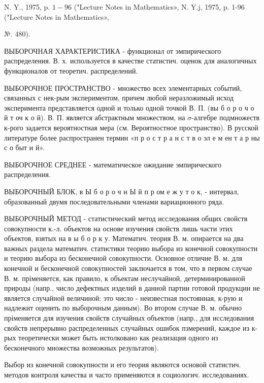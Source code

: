 \documentclass[10pt]{article}
\begin{document}
N. Y., 1975, p. $1-96$ ("Lecture Notes in Mathematics», N. Y.j, 1975, p. 1-96 ("Lecture Notes in Mathematics»,

№. 480).



ВЫБОРОЧНАЯ ХАРАКТЕРИСТИКА - функционал от эмпирического распределения. В. х. используется в качестве статистич. оценок для аналогичных функционалов от теоретич. распределений.



ВЫБОРОЧНОЕ ПРОСТРАНСТВО - множество всех элементарных событий, связанных с нек-рым экспериментом, причем любой неразложимый исход эксперимента представляется одной и только одной точкой В. П. (вы б о р о ч о й т оч к о й). В. П. является абстрактным множеством, на $\sigma$-алгебре подмножеств к-рого задается вероятностная мера (см. Вероятностное пространство). В русской литературе более распространен термин «п р о с т р а н с т в о эл е м ен т а р ны с о быт и й».



ВЫБОРОЧНОЕ СРЕДНЕЕ - математическое ожидание эмпирического распределения.



ВЫБОРОЧНЫЙ БЛОК, в Ы б о р о ч н Ы й п р ом е ж у т о к, - интервал, образованный двумя последовательными членами вариационного ряда.



ВЫБОРОЧНЫЙ МЕТОД - статистический метод исследования общих свойств совокупности к.-л. объектов на основе изучения свойств лишь части этих объектов, взятых на в ы б о р к у. Математич. теория В. м. опирается на два важных раздела математич. статистики теорию выбора из конечной совокупности и теорию выбора из бесконечной совокупности. Основное отличие В. м. для конечной и бесконечной совокупностей заключается в том, что в первом случае В. м. пріменяется, как правило, к объектам неслучайной, детерминированной природы (напр., число дефектных изделий в данной партии готовой продукции не является случайной величиной: это число - неизвестная постоянная, к-рую и надлежит оценить по выборочным данным). Во втором случае В. м. обычно пріменяется для изучения свойств случайных объектов (напр., для исследования свойств непрерывно распределенных случайных ошибок пзмерений, каждое из к-рых теоретически может быть истолковано как реализация одного из бесконечного множества возможных результатов).



Выбор из конечной совокупности и его теория являются основой статистич. методов контроля качества и часто применяются в социологич. исследованиях.
\end{document}
